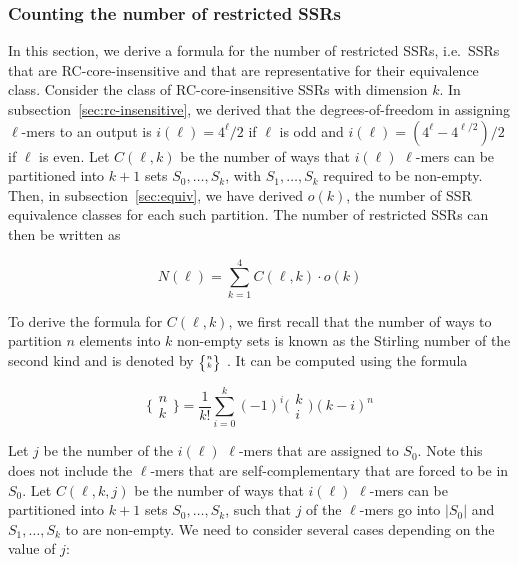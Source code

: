 \documentclass[
  11pt,
  twoside,
  BCOR=10mm,
  listof=totoc]{scrbook}
\begin{document}
\hypertarget{counting-the-number-of-restricted-ssrs}{%
\subsubsection{Counting the number of restricted SSRs}\label{counting-the-number-of-restricted-ssrs}}

In this section, we derive a formula for the number of restricted SSRs, i.e.~SSRs that are RC-core-insensitive and that are representative for their equivalence class. Consider the class of RC-core-insensitive SSRs with dimension \(k\). In subsection~\ref{sec:rc-insensitive}, we derived that the degrees-of-freedom in assigning \(\ell\)-mers to an output is \(i(\ell) = 4^\ell/2\) if \(\ell\) is odd and \(i(\ell) = (4^\ell - 4^{\ell / 2})/2\) if \(\ell\) is even. Let \(C(\ell,k)\) be the number of ways that \(i(\ell)\) \(\ell\)-mers can be partitioned into \(k+1\) sets \(S_0, \ldots, S_k\), with \(S_1, \ldots, S_k\) required to be non-empty. Then, in subsection~\ref{sec:equiv}, we have derived \(o(k)\), the number of SSR equivalence classes for each such partition. The number of restricted SSRs can then be written as

\begin{equation}
N(\ell) = \sum_{k=1}^{4} C(\ell, k) \cdot o(k)
\label{eq:N}
\end{equation}

To derive the formula for \(C(\ell, k)\), we first recall that the number of ways to partition \(n\) elements into \(k\) non-empty sets is known as the Stirling number of the second kind and is denoted by \(\tiny\bigg\{%
\begin{matrix}
    n \\
    k
\end{matrix}
\bigg\} \) \autocite[p.265]{grahamConcreteMathematicsFoundation1994}. It can be computed using the formula

\begin{equation*}
    \bigg\{%
\begin{matrix}
    n \\
    k
\end{matrix}
\bigg\}  = \frac{1}{k!}\sum_{i=0}^k(-1)^i\bigg(
\begin{matrix}
    k \\
    i
\end{matrix}
\bigg) (k-i)^n
\end{equation*}

Let \(j\) be the number of the \(i(\ell)\) \(\ell\)-mers that are assigned to \(S_0\). Note this does not include the \(\ell\)-mers that are self-complementary that are forced to be in \(S_0\). Let \(C(\ell,k,j)\) be the number of ways that \(i(\ell)\) \(\ell\)-mers can be partitioned into \(k+1\) sets \(S_0, \ldots, S_k\), such that \(j\) of the \(\ell\)-mers go into \(|S_0|\) and \(S_1, \ldots, S_k\) to are non-empty. We need to consider several cases depending on the value of \(j\):
\end{document}
